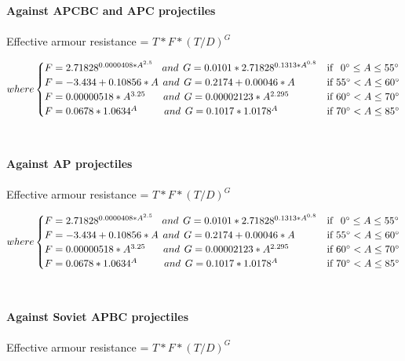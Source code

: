 \documentclass[]{article}
\begin{document}
\noindent \textbf{Against APCBC and APC projectiles}
\\\\
Effective armour resistance = $T*F*(T/D)^G$

\[
where
\begin{cases}

F=2.71828^{0.0000408*A^{2.5}}\:\:\:\:and\:\:G=0.0101*2.71828^{0.1313*A^{0.8}} & \text{if \:\:$0\degree \leq A\leq55\degree$} \\
F=-3.434+0.10856*A\:\:and\:\:G=0.2174 + 0.00046*A & \text{if $55\degree<A\leq60\degree$} \\
F=0.00000518*A^{3.25}\:\:\:\:\:\:\:\:and\:\:G=0.00002123*A^{2.295} & \text{if $60\degree<A\leq70\degree$} \\
F=0.0678*1.0634^A\:\:\:\:\:\:\:\:\:\:\:\:and\:\:G=0.1017*1.0178^A & \text{if $70\degree<A\leq85\degree$}

\end{cases}
\]
\\\\
\noindent \textbf{Against AP projectiles}
\\\\
Effective armour resistance = $T*F*(T/D)^G$

\[
where
\begin{cases}

F=2.71828^{0.0000408*A^{2.5}}\:\:\:\:and\:\:G=0.0101*2.71828^{0.1313*A^{0.8}} & \text{if \:\:$0\degree \leq A\leq55\degree$} \\
F=-3.434+0.10856*A\:\:and\:\:G=0.2174 + 0.00046*A & \text{if $55\degree<A\leq60\degree$} \\
F=0.00000518*A^{3.25}\:\:\:\:\:\:\:\:and\:\:G=0.00002123*A^{2.295} & \text{if $60\degree<A\leq70\degree$} \\
F=0.0678*1.0634^A\:\:\:\:\:\:\:\:\:\:\:\:and\:\:G=0.1017*1.0178^A & \text{if $70\degree<A\leq85\degree$}

\end{cases}
\]
\\\\
\noindent \textbf{Against Soviet APBC projectiles}
\\\\
Effective armour resistance = $T*F*(T/D)^G$
\end{document}
